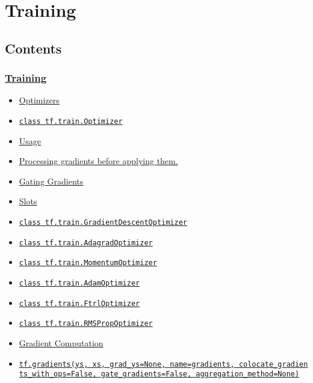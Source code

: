 

\section{Training }\label{training}

\subsection{Contents}\label{contents}

\subsubsection{\texorpdfstring{\protect\hyperlink{AUTOGENERATED-training}{Training}}{Training}}\label{training-1}

\begin{itemize}
\tightlist
\item
  \protect\hyperlink{AUTOGENERATED-optimizers}{Optimizers}
\item
  \protect\hyperlink{Optimizer}{\texttt{class\ tf.train.Optimizer}}
\item
  \protect\hyperlink{AUTOGENERATED-usage}{Usage}
\item
  \protect\hyperlink{AUTOGENERATED-processing-gradients-before-applying-them.}{Processing
  gradients before applying them.}
\item
  \protect\hyperlink{AUTOGENERATED-gating-gradients}{Gating Gradients}
\item
  \protect\hyperlink{AUTOGENERATED-slots}{Slots}
\item
  \protect\hyperlink{GradientDescentOptimizer}{\texttt{class\ tf.train.GradientDescentOptimizer}}
\item
  \protect\hyperlink{AdagradOptimizer}{\texttt{class\ tf.train.AdagradOptimizer}}
\item
  \protect\hyperlink{MomentumOptimizer}{\texttt{class\ tf.train.MomentumOptimizer}}
\item
  \protect\hyperlink{AdamOptimizer}{\texttt{class\ tf.train.AdamOptimizer}}
\item
  \protect\hyperlink{FtrlOptimizer}{\texttt{class\ tf.train.FtrlOptimizer}}
\item
  \protect\hyperlink{RMSPropOptimizer}{\texttt{class\ tf.train.RMSPropOptimizer}}
\item
  \protect\hyperlink{AUTOGENERATED-gradient-computation}{Gradient
  Computation}
\item
  \protect\hyperlink{gradients}{\texttt{tf.gradients(ys,\ xs,\ grad\_ys=None,\ name=\textquotesingle{}gradients\textquotesingle{},\ colocate\_gradients\_with\_ops=False,\ gate\_gradients=False,\ aggregation\_method=None)}}

\end{itemize}

